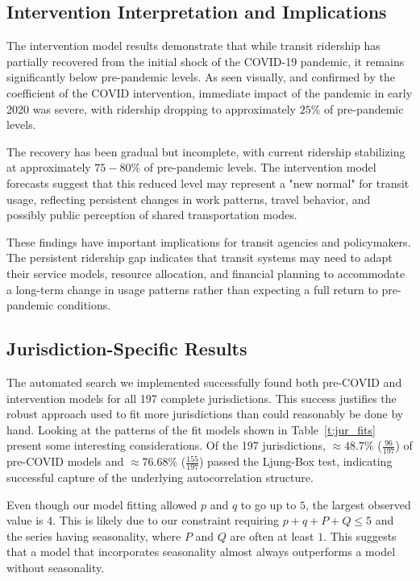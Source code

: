 \documentclass[11pt]{article}
\begin{document}
\subsection{Intervention Interpretation and Implications}

The intervention model results demonstrate that while transit ridership has partially recovered from the initial shock of the COVID-19 pandemic, it remains significantly below pre-pandemic levels. As seen visually, and confirmed by the coefficient of the COVID intervention, immediate impact of the pandemic in early 2020 was severe, with ridership dropping to approximately $25\%$ of pre-pandemic levels.


The recovery has been gradual but incomplete, with current ridership stabilizing at approximately $75-80\%$ of pre-pandemic levels. The intervention model forecasts suggest that this reduced level may represent a "new normal" for transit usage, reflecting persistent changes in work patterns, travel behavior, and possibly public perception of shared transportation modes.

These findings have important implications for transit agencies and policymakers. The persistent ridership gap indicates that transit systems may need to adapt their service models, resource allocation, and financial planning to accommodate a long-term change in usage patterns rather than expecting a full return to pre-pandemic conditions.

\subsection{Jurisdiction-Specific Results}

The automated search we implemented successfully found both pre-COVID and intervention models for all 197 complete jurisdictions. This success justifies the robust approach used to fit more jurisdictions than could reasonably be done by hand. Looking at the patterns of the fit models shown in Table~\ref{t:jur_fits} present some interesting considerations. Of the 197 jurisdictions, $\approx48.7\%$ ($\frac{96}{197}$) of pre-COVID models and $\approx76.68\%$ ($\frac{155}{197}$) passed the Ljung-Box test, indicating successful capture of the underlying autocorrelation structure. 

Even though our model fitting allowed $p$ and $q$ to go up to $5$, the largest observed value is $4$. This is likely due to our constraint requiring $p + q + P + Q \leq 5$ and the series having seasonality, where $P$ and $Q$ are often at least $1$. This suggests that a model that incorporates seasonality almost always outperforms a model without seasonality.
\end{document}

